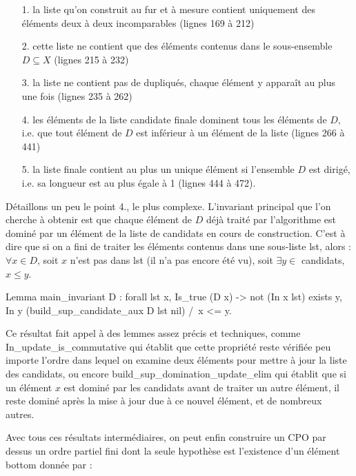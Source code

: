\documentclass{article}
\newcommand\code[1]{{\fontfamily{lmtt}\selectfont #1}}
\theoremstyle{definition}
\begin{document}
\begin{itemize}
\item[1.] la liste qu'on construit au fur et à mesure contient uniquement des éléments deux à deux incomparables (lignes 169 à 212)
\item[2.] cette liste ne contient que des éléments contenus dans le sous-ensemble $D \subseteq X$ (lignes 215 à 232)
\item[3.] la liste ne contient pas de dupliqués, chaque élément y apparaît au plus une fois (lignes 235 à 262)
\item[4.] les éléments de la liste \code{candidate} finale dominent tous les éléments de $D$, i.e. que tout élément de $D$ est inférieur à un élément de la liste (lignes 266 à 441)
\item[5.] la liste finale contient au plus un unique élément si l'ensemble $D$ est dirigé, i.e. sa longueur est au plus égale à 1 (lignes 444 à 472).
\end{itemize}


Détaillons un peu le point 4., le plus complexe. L'invariant principal que l'on cherche à obtenir est que chaque élément de $D$ déjà traité par l'algorithme est dominé par un élément de la liste de candidats en cours de construction. C'est à dire que si on a fini de traiter les éléments contenus dans une sous-liste \code{lst}, alors : $\forall x \in D$, soit $x$ n'est pas dans \code{lst} (il n'a pas encore été vu), soit $\exists y \in$ \code{candidats}, $x \leq y$.


\begin{coq}
Lemma main_invariant D : forall lst x, Is_true (D x) -> not (In x lst) 
    \/ exists y, In y (build_sup_candidate_aux D lst nil) /\ x <= y.
\end{coq}

Ce résultat fait appel à des lemmes assez précis et techniques, comme \code{In\_update\_is\_commutative} qui établit que cette propriété reste vérifiée peu importe l'ordre dans lequel on examine deux éléments pour mettre à jour la liste des \code{candidats}, ou encore \code{build\_sup\_domination\_update\_elim} qui établit que si un élément $x$ est dominé par les \code{candidats} avant de traiter un autre élément, il reste dominé après la mise à jour due à ce nouvel élément, et de nombreux autres.

Avec tous ces résultats intermédiaires, on peut enfin construire un CPO par dessus un ordre partiel fini dont la seule hypothèse est l'existence d'un élément bottom donnée par :
\end{document}

